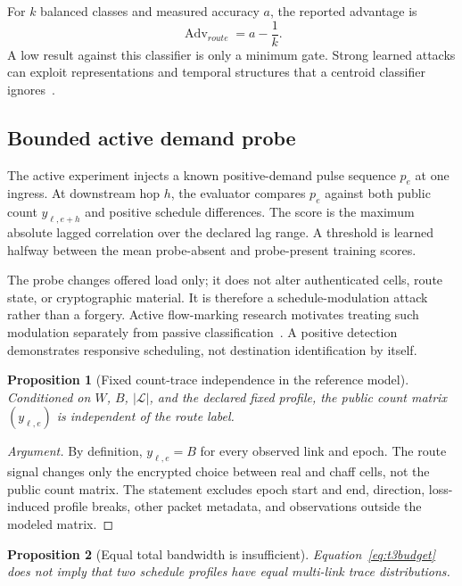 \documentclass[11pt,oneside]{article}
\newtheorem{proposition}{Proposition}
\begin{document}
For $k$ balanced classes and measured accuracy $a$, the reported advantage is
\begin{equation}
\operatorname{Adv}_{route}=a-\frac{1}{k}.
\label{eq:t3advantage}
\end{equation}
A low result against this classifier is only a minimum gate. Strong learned attacks can exploit representations and temporal structures that a centroid classifier ignores~\cite{deepcorr,blindperturb,gtt23,onlinewf,realitycheck2026}.

\subsection{Bounded active demand probe}

The active experiment injects a known positive-demand pulse sequence $p_e$ at one ingress. At downstream hop $h$, the evaluator compares $p_e$ against both public count $y_{\ell,e+h}$ and positive schedule differences. The score is the maximum absolute lagged correlation over the declared lag range. A threshold is learned halfway between the mean probe-absent and probe-present training scores.

The probe changes offered load only; it does not alter authenticated cells, route state, or cryptographic material. It is therefore a schedule-modulation attack rather than a forgery. Active flow-marking research motivates treating such modulation separately from passive classification~\cite{dropmark,duster,activeflowmark2026}. A positive detection demonstrates responsive scheduling, not destination identification by itself.

\begin{proposition}[Fixed count-trace independence in the reference model]
Conditioned on $W$, $B$, $|\mathcal{L}|$, and the declared fixed profile, the public count matrix $(y_{\ell,e})$ is independent of the route label.
\end{proposition}

\begin{proof}[Argument]
By definition, $y_{\ell,e}=B$ for every observed link and epoch. The route signal changes only the encrypted choice between real and chaff cells, not the public count matrix. The statement excludes epoch start and end, direction, loss-induced profile breaks, other packet metadata, and observations outside the modeled matrix.
\end{proof}

\begin{proposition}[Equal total bandwidth is insufficient]
Equation~\eqref{eq:t3budget} does not imply that two schedule profiles have equal multi-link trace distributions.
\end{proposition}
\end{document}
